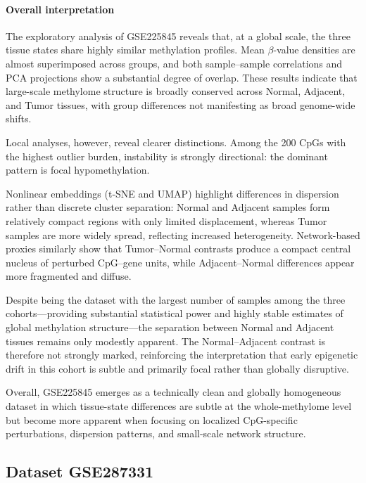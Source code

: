 \documentclass[10pt]{extarticle}
\begin{document}
\paragraph{Overall interpretation}

The exploratory analysis of GSE225845 reveals that, at a global scale, the three tissue states
share highly similar methylation profiles. Mean $\beta$-value densities are almost superimposed
across groups, and both sample--sample correlations and PCA projections show a substantial degree
of overlap. These results indicate that large-scale methylome structure is broadly conserved across
Normal, Adjacent, and Tumor tissues, with group differences not manifesting as broad genome-wide
shifts.

Local analyses, however, reveal clearer distinctions. Among the 200 CpGs with the highest outlier
burden, instability is strongly directional: the dominant pattern is focal hypomethylation. 

Nonlinear embeddings (t-SNE and UMAP) highlight differences in dispersion rather than discrete
cluster separation: Normal and Adjacent samples form relatively compact regions with only limited
displacement, whereas Tumor samples are more widely spread, reflecting increased heterogeneity.
Network-based proxies similarly show that Tumor--Normal contrasts produce a compact central nucleus
of perturbed CpG--gene units, while Adjacent--Normal differences appear more fragmented and diffuse.

Despite being the dataset with the largest number of samples among the three cohorts---providing
substantial statistical power and highly stable estimates of global methylation structure---the
separation between Normal and Adjacent tissues remains only modestly apparent. The Normal--Adjacent
contrast is therefore not strongly marked, reinforcing the interpretation that early
epigenetic drift in this cohort is subtle and primarily focal rather than globally disruptive.

Overall, GSE225845 emerges as a technically clean and globally homogeneous dataset in which
tissue-state differences are subtle at the whole-methylome level but become more apparent when
focusing on localized CpG-specific perturbations, dispersion patterns, and small-scale network
structure.


\subsection{Dataset GSE287331}
\label{subsec:gse287331}
\end{document}
